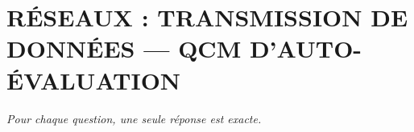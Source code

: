 
\section*{\textcolor{chapcolor}{\MakeUppercase{Réseaux : transmission de données — QCM d'auto-évaluation}}}

\begin{center}
\textit{Pour chaque question, une seule réponse est exacte.}
\end{center}


